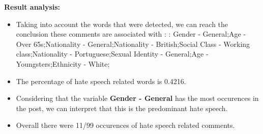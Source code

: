 \documentclass[11pt]{article}
\begin{document}
\textbf{\Large Result analysis:}

\begin{itemize}\item Taking into account the words that were detected, we can reach the conclusion these comments are associated with : : Gender - General;Age - Over 65s;Nationality - General;Nationality - British;Social Class - Working class;Nationality - Portuguese;Sexual Identity - General;Age - Youngsters;Ethnicity - White;%

\item The percentage of hate speech related words is 0.4216.

\item Considering that the variable \textbf{Gender - General} has the most occurences in the post, we can interpret that this is the predominant hate speech.

\item Overall there were 11/99 occurences of hate speech related comments.\end{itemize}
\end{document}

